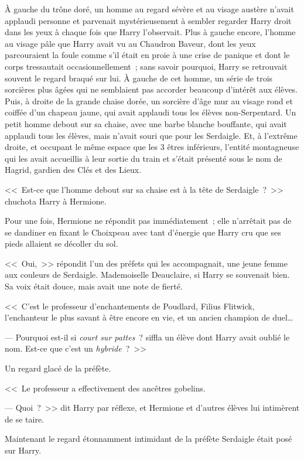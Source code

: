 À gauche du trône doré, un homme au regard sévère et au visage austère n'avait applaudi personne et parvenait mystérieusement à sembler regarder Harry droit dans les yeux à chaque fois que Harry l'observait. Plus à gauche encore, l'homme au visage pâle que Harry avait vu au Chaudron Baveur, dont les yeux parcouraient la foule comme s'il était en proie à une crise de panique et dont le corps tressautait occasionnellement~; sans savoir pourquoi, Harry se retrouvait souvent le regard braqué sur lui. À gauche de cet homme, un série de trois sorcières plus âgées qui ne semblaient pas accorder beaucoup d'intérêt aux élèves. Puis, à droite de la grande chaise dorée, un sorcière d'âge mur au visage rond et coiffée d'un chapeau jaune, qui avait applaudi tous les élèves non-Serpentard. Un petit homme debout sur sa chaise, avec une barbe blanche bouffante, qui avait applaudi tous les élèves, mais n'avait souri que pour les Serdaigle. Et, à l'extrême droite, et occupant le même espace que les 3 êtres inférieurs, l'entité montagneuse qui les avait accueillis à leur sortie du train et s'était présenté sous le nom de Hagrid, gardien des Clés et des Lieux.

<<~Est-ce que l'homme debout sur sa chaise est à la tête de Serdaigle~?~>> chuchota Harry à Hermione.

Pour une fois, Hermione ne répondit pas immédiatement~; elle n'arrêtait pas de se dandiner en fixant le Choixpeau avec tant d'énergie que Harry cru que ses pieds allaient se décoller du sol.

<<~Oui,~>> répondit l'un des préfets qui les accompagnait, une jeune femme aux couleurs de Serdaigle. Mademoiselle Deauclaire, si Harry se souvenait bien. Sa voix était douce, mais avait une note de fierté.

<<~C'est le professeur d'enchantements de Poudlard, Filius Flitwick, l'enchanteur le plus savant à être encore en vie, et un ancien champion de duel…

--- Pourquoi est-il si \emph{court sur pattes}~? siffla un élève dont Harry avait oublié le nom. Est-ce que c'est un \emph{hybride}~?~>>

Un regard glacé de la préfète.

<<~Le professeur a effectivement des ancêtres gobelins.

--- Quoi~?~>> dit Harry par réflexe, et Hermione et d'autres élèves lui intimèrent de se taire.

Maintenant le regard étonnamment intimidant de la préfète Serdaigle était posé sur Harry.

